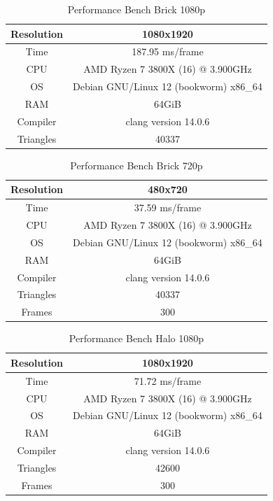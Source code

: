 \documentclass[12pt]{article}
\begin{document}
\begin{table}[H]
	\caption{Performance Bench Brick 1080p}
	\centering
	\begin{tabular}{|c|c|}
		\hline
		Resolution& 1080x1920\\\hline
		Time& 187.95 ms/frame\\\hline
		CPU&AMD Ryzen 7 3800X (16) @ 3.900GHz\\\hline
		OS&Debian GNU/Linux 12 (bookworm) x86\_64\\\hline
		RAM&64GiB\\\hline
		Compiler&clang version 14.0.6\\\hline
		Triangles&40337\\\hline
	\end{tabular}
	\label{table:performance-1080-brick}
\end{table}

\begin{table}[H]
	\caption{Performance Bench Brick 720p}
	\centering
	\begin{tabular}{|c|c|}
		\hline
		Resolution& 480x720\\\hline
		Time& 37.59 ms/frame\\\hline
		CPU&AMD Ryzen 7 3800X (16) @ 3.900GHz\\\hline
		OS&Debian GNU/Linux 12 (bookworm) x86\_64\\\hline
		RAM&64GiB\\\hline
		Compiler&clang version 14.0.6\\\hline
		Triangles&40337\\\hline
		Frames&300\\\hline
	\end{tabular}
	\label{table:performance-720-brick}
\end{table}

\begin{table}[H]
	\caption{Performance Bench Halo 1080p}
	\centering
	\begin{tabular}{|c|c|}
		\hline
		Resolution& 1080x1920\\\hline
		Time& 71.72 ms/frame\\\hline
		CPU&AMD Ryzen 7 3800X (16) @ 3.900GHz\\\hline
		OS&Debian GNU/Linux 12 (bookworm) x86\_64\\\hline
		RAM&64GiB\\\hline
		Compiler&clang version 14.0.6\\\hline
		Triangles&42600\\\hline
		Frames&300\\\hline
	\end{tabular}
	\label{table:performance-1080-halo}
\end{table}
\end{document}
